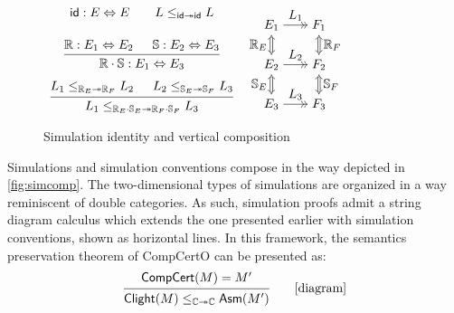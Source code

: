 \documentclass[sigplan,10pt,authordraft]{acmart}
\begin{document}
\begin{figure} %
  $\begin{array}{c}
    \kw{id} : E \Leftrightarrow E
    \qquad
    L \le_{\kw{id} \twoheadrightarrow \kw{id}} L
    \\[1.5em]
   {\begin{prooftree}
    \hypo{\mathbb{R} : E_1 \Leftrightarrow E_2}
    \hypo{\mathbb{S} : E_2 \Leftrightarrow E_3}
    \infer2{\mathbb{R} \cdot \mathbb{S} : E_1 \Leftrightarrow E_3}
    \end{prooftree}}
    \\[1.5em]
   {\begin{prooftree}
    \hypo{L_1 \le_{\mathbb{R}_E \twoheadrightarrow \mathbb{R}_F} L_2}
    \hypo{L_2 \le_{\mathbb{S}_E \twoheadrightarrow \mathbb{S}_F} L_3}
    \infer2{
      L_1 \le_{\mathbb{R}_E \cdot \mathbb{S}_E \twoheadrightarrow
               \mathbb{R}_F \cdot \mathbb{S}_F} L_3}
    \end{prooftree}}
  \end{array}
  \:\:
  \begin{tikzpicture}[baseline=0.6mm,xscale=0.66,yscale=0.55]
    \node (A1) at (-1,  2) {$E_1$};
    \node (A2) at (-1,  0) {$E_2$};
    \node (A3) at (-1, -2) {$E_3$};
    \node (B1) at ( 1,  2) {$F_1$};
    \node (B2) at ( 1,  0) {$F_2$};
    \node (B3) at ( 1, -2) {$F_3$};
    \draw (A1) edge[->>] node[auto] {$L_1$} (B1);
    \draw (A2) edge[->>] node[auto] {$L_2$} (B2);
    \draw (A3) edge[->>] node[auto] {$L_3$} (B3);
    \begin{scope}[double equal sign distance, {Implies[]}-{Implies[]}]
      \draw (A1) edge[double] node[auto,swap] {$\mathbb{R}_E$} (A2);
      \draw (B1) edge[double] node[auto] {$\mathbb{R}_F$} (B2);
      \draw (A2) edge[double] node[auto,swap] {$\mathbb{S}_E$} (A3);
      \draw (B2) edge[double] node[auto] {$\mathbb{S}_F$} (B3);
    \end{scope}
  \end{tikzpicture}
  $
  \caption{Simulation identity and vertical composition}
  \label{fig:simcomp}
\end{figure}

Simulations and simulation conventions
compose in the way depicted in \autoref{fig:simcomp}.
The two-dimensional types of simulations
are organized in a way reminiscent of double categories.
As such,
simulation proofs admit a string diagram calculus \cite{dcsd}
which extends the one presented earlier
with simulation conventions,
shown as horizontal lines.
In this framework,
the semantics preservation theorem of CompCertO
can be presented as:
\[
  \begin{prooftree}
    \hypo{\kw{CompCert}(M) = M'}
    \infer1{
      \kw{Clight}(M)
      \le_{\mathbb{C} \twoheadrightarrow \mathbb{C}}
      \kw{Asm}(M')}
  \end{prooftree}
  \qquad
  \mbox{[diagram]}
\]
\end{document}
